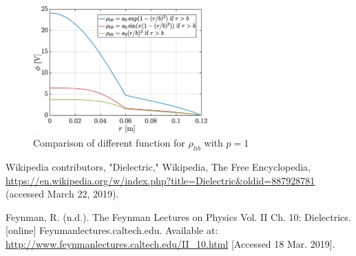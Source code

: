 \documentclass[a4paper,12pt,twoside]{article}
\begin{document}
      \begin{figure}[h]
        \centering
        \includegraphics[width=0.6\textwidth]{graphs/facrho.eps}
        \caption{Comparison of different function for $\rho_{lib}$ with $p=1$}
        \label{fig:facrho}
      \end{figure}

  \newpage
  \begin{thebibliography}{99}
     Wikipedia contributors, "Dielectric," Wikipedia, The Free Encyclopedia, \url{https://en.wikipedia.org/w/index.php?title=Dielectric&oldid=887928781} (accessed March 22, 2019).

     Feynman, R. (n.d.). The Feynman Lectures on Physics Vol. II Ch. 10: Dielectrics. [online] Feynmanlectures.caltech.edu. Available at: \url{http://www.feynmanlectures.caltech.edu/II_10.html} [Accessed 18 Mar. 2019].
  \end{thebibliography}
\end{document}
